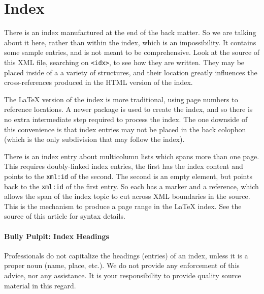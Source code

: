 \documentclass[10pt,]{article}
\theoremstyle{plain}
\theoremstyle{definition}
\theoremstyle{definition}
\theoremstyle{definition}
\theoremstyle{definition}
\theoremstyle{definition}
\theoremstyle{definition}
\numberwithin{equation}{section}
\begin{document}
\section[{Index}]{Index}\label{appendix-4}
\hypertarget{p-796}{}%
There is an index manufactured at the end of the back matter.  So we are talking about it here, rather than within the index, which is an impossibility.  It contains some sample entries, and is not meant to be comprehensive.  Look at the source of this XML file, searching on \lstinline?<idx>?, to see how they are written.  They may be placed inside of a a variety of structures, and their location greatly influences the cross-references produced in the HTML version of the index.%
\par
\hypertarget{p-797}{}%
The \LaTeX{} version of the index is more traditional, using page numbers to reference locations.  A newer package is used to create the index, and so there is no extra intermediate step required to process the index.  The one downside of this convenience is that index entries may not be placed in the back colophon (which is the only subdivision that may follow the index).%
\par
\hypertarget{p-798}{}%
There is an index entry about multicolumn lists which spans more than one page.  This requires doubly-linked index entries, the first has the index content and points to the \lstinline?xml:id? of the second.  The second is an empty element, but points back to the \lstinline?xml:id? of the first entry.  So each has a marker and a reference, which allows the span of the index topic to cut across XML boundaries in the source.  This is the mechanism to produce a page range in the \LaTeX{} index.  See the source of this article for syntax details.%
\typeout{************************************************}
\typeout{************************************************}
\paragraph[{Bully Pulpit: Index Headings}]{Bully Pulpit: Index Headings}\hypertarget{paragraphs-24}{}
\hypertarget{p-799}{}%
Professionals do not capitalize the headings (entries) of an index, unless it is a proper noun (name, place, etc.\@).  We do not provide any enforcement of this advice, nor any assistance.  It is your responsibility to provide quality source material in this regard.%
\typeout{************************************************}
\typeout{************************************************}
\end{document}
